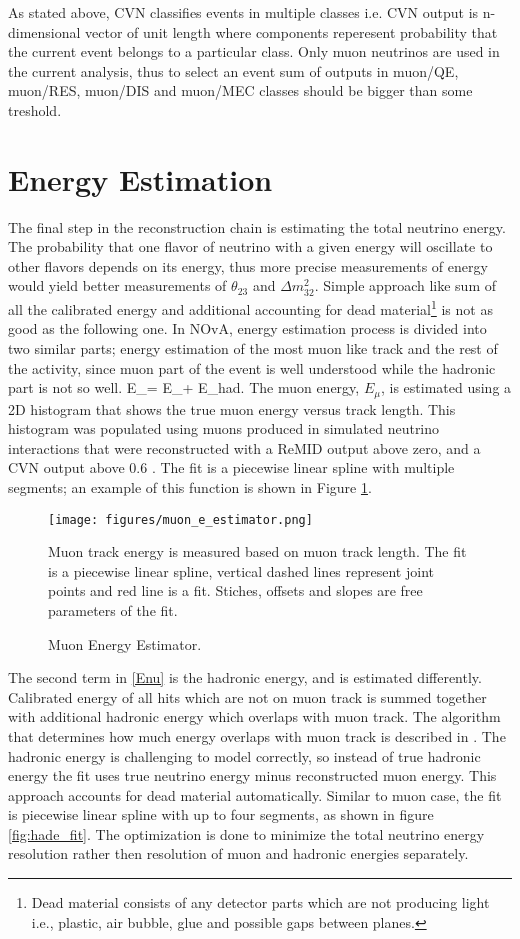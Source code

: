 As stated above, CVN classifies events in multiple classes i.e. CVN output is n-dimensional vector of unit length
where components reperesent probability that the current event belongs to a particular class. Only muon neutrinos
are used in the current analysis, thus to select an event sum of outputs in muon/QE, muon/RES, muon/DIS and 
muon/MEC classes should be bigger than some treshold.

\section{Energy Estimation}
The final step in the reconstruction chain is estimating the total neutrino energy. The probability that one
flavor of neutrino with a given energy will oscillate to other flavors depends on its energy, thus more
precise measurements of energy would yield better measurements of $\theta_{23}$ and $\Delta m_{32}^2$.
Simple approach like sum of all the calibrated energy and additional accounting for dead 
material\footnote{Dead material consists of any detector parts which are not producing light i.e., plastic, air 
bubble, glue and possible gaps between planes.} is not as good as the following one. In NOvA, energy estimation 
process is divided into two similar parts; energy estimation of the most muon like track and the rest of the 
activity, since muon part of the event is well understood while the hadronic part is not so well.
\be
E_\nu = E_\mu + E_{had}.
\ee 
The muon energy, $E_{\mu}$, is estimated using a 2D histogram that shows the true muon energy versus track length.
This histogram was populated using muons produced in simulated neutrino interactions that were reconstructed with
a ReMID output above zero, and a CVN output above 0.6 \cite{energy_technote}. The fit is a piecewise linear spline
with multiple segments; an example of this function is shown in Figure \ref{fig:mue_fit}.
\begin{figure}[t]
\texttt{[image: figures/muon\_e\_estimator.png]}
\centering
\caption{Muon Energy Estimator.}
{Muon track energy is measured based on muon track length. The fit is a piecewise linear spline, vertical dashed
lines represent joint points and red line is a fit. Stiches, offsets and slopes are free parameters of the fit.}
\label{fig:mue_fit}
\end{figure}

The second term in \ref{Enu} is the hadronic energy, and is estimated differently. Calibrated energy of all hits 
which are not on muon track is summed together with additional hadronic energy which overlaps with muon track. 
The algorithm that determines how much energy overlaps with muon track is described in \cite{Kanika}. The hadronic
energy is challenging to model correctly, so instead of true hadronic energy the fit uses true neutrino energy minus
reconstructed muon energy. This approach accounts for dead material automatically. Similar to muon case, the fit 
is piecewise linear spline with up to four segments, as shown in figure \ref{fig:hade_fit}. The optimization is done
to minimize the total neutrino energy resolution rather then resolution of muon and hadronic energies separately. 

